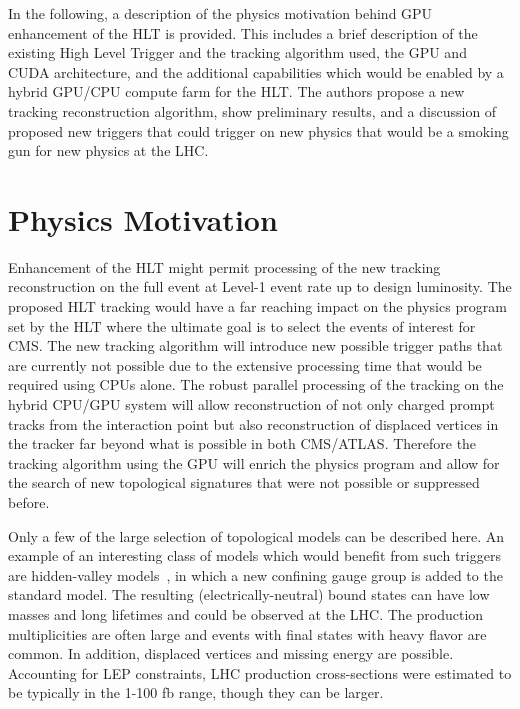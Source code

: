 \documentclass{JINST}
\begin{document}
In the following, a description of the physics motivation behind GPU enhancement of the HLT is provided.
This includes a brief description of the existing High Level Trigger and the tracking algorithm used, 
the GPU and CUDA architecture, and the additional capabilities
which would be enabled by a hybrid GPU/CPU compute farm for the HLT. 
The authors propose a new tracking reconstruction algorithm, show preliminary results,
and a discussion of proposed new triggers that could trigger on new
physics that would be a smoking gun for new physics at the LHC.


\section{Physics Motivation}

Enhancement of the HLT might permit processing of the new tracking reconstruction on the full event 
at Level-1 event rate up to design luminosity. The proposed HLT tracking would have a far reaching impact on the physics program 
set by the HLT where the ultimate goal is to select the events of interest for CMS.
The new tracking algorithm will introduce new possible trigger paths that are currently not possible due to the extensive
 processing time that would be required using CPUs alone. The robust parallel processing of the tracking on the 
hybrid CPU/GPU system will allow reconstruction of not only charged prompt tracks from the interaction point
but also reconstruction of displaced vertices in the tracker far beyond what is possible in both CMS/ATLAS.
Therefore the tracking algorithm using the GPU will enrich the physics program and allow for the search of new topological 
signatures that were not possible or suppressed before.

Only a few of the large selection of topological models can be described here. An example of an
interesting class of models which would benefit from such triggers are hidden-valley models~\cite{bib:hiddenvalley}, 
in which a new confining gauge group is added to the standard model. The resulting (electrically-neutral) bound states can have
 low masses and long lifetimes and could be observed at the LHC. The production multiplicities are often large and events with final states with heavy flavor are
common. In addition, displaced vertices and missing energy are possible. Accounting for LEP constraints, LHC production 
cross-sections were estimated to be typically in the 1-100 fb range, though they can be larger.
\end{document}
